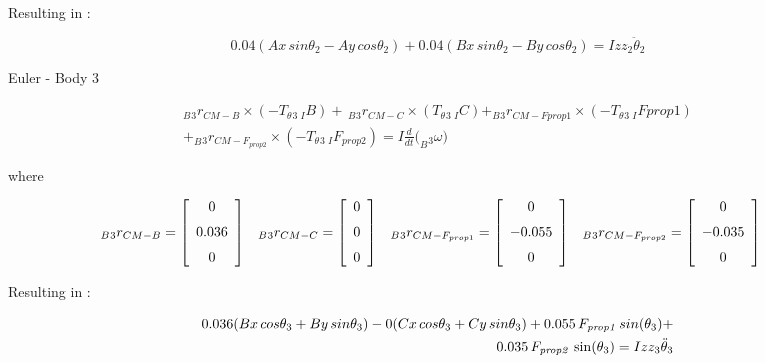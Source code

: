 Resulting in :

\begin{equation}\label{euler2end}
	0.04(Ax\,sin\theta_{{2}} - Ay\, cos\theta_{{2}}) + 0.04(Bx\, sin\theta_{{2}} - By\, cos\theta_{{2}}) = Izz_{{2}}\ddot\theta_{{2}}
\end{equation}

Euler -  Body 3
 
\begin{equation}\label{euler3}\begin{split}
	_B{_3}{r}_{CM-B}\times (-T_\theta{_3} \, {_I}{B}) + \,_B{_3}{r}_{CM-C} \times (T_\theta{_3} \, {_I}{C}) + _B{_3}{r}_{CM-F{prop1}}\times (-T_\theta{_3} \, {_I}F{prop1})  \\ +  _B{_3}{r}_{CM-F_{prop2}}\times (-T_\theta{_3} \, {_I}F_{prop2}) = I  \frac{d}{dt}(_B{_3}{\omega)}
	\end{split}
\end{equation}
 
 where

\begin{align*}
_B{_3}{r}_{CM-B} &= \left[ \begin {array}{c} 0\\ \noalign{\medskip}0.036\\ \noalign{\medskip}0
\end {array} \right] &
_B{_3}{r}_{CM-C} &= \left[ \begin {array}{c} 0\\ \noalign{\medskip}0\\ \noalign{\medskip}0
\end {array} \right]&
_B{_3}{r}_{CM-F_{prop1}} &= \left[ \begin {array}{c} 0\\ \noalign{\medskip}-0.055\\ \noalign{\medskip}0
\end {array} \right]&
_B{_3}{r}_{CM-F_{prop2}} &= \left[ \begin {array}{c}0\\ \noalign{\medskip}-0.035\\ \noalign{\medskip}0
\end {array} \right]&
\end{align*}

Resulting in :

\begin{equation}\label{euler3end}
\begin{split}
	0.036(Bx\,cos\theta_{{3}} + By\, sin\theta_{{3}}) - 0(Cx \,cos\theta_{{3}} + Cy \,sin\theta_{{3}}) + 0.055\,F_{{\it prop1}}\,sin(\theta_{{3}}) +\\ 0.035\,F_{{\it prop2}}\,\sin (\theta_{{3}}) = Izz_{{3}}\ddot\theta_{{3}}
	\end{split}
\end{equation}
 
